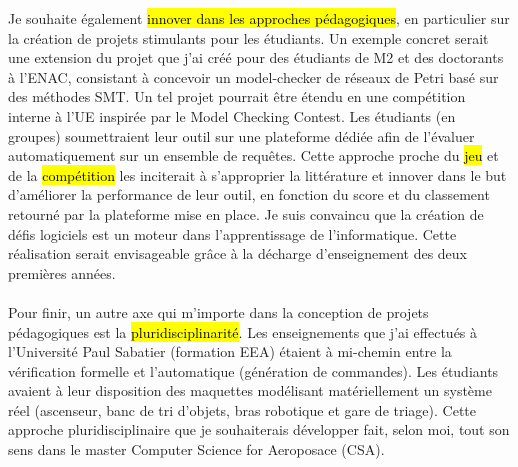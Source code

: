 Je souhaite également \hl{innover dans les approches pédagogiques}, en
particulier sur la création de projets stimulants pour les étudiants. Un exemple
concret serait une extension du projet que j'ai créé pour des étudiants de M2 et
des doctorants à l'ENAC, consistant à concevoir un model-checker de réseaux de
Petri basé sur des méthodes SMT. Un tel projet pourrait être étendu en une
compétition interne à l'UE inspirée par le Model Checking Contest. Les étudiants
(en groupes) soumettraient leur outil sur une plateforme dédiée afin de
l'évaluer automatiquement sur un ensemble de requêtes. Cette approche proche du
\hl{jeu} et de la \hl{compétition} les inciterait à s'approprier la littérature
et innover dans le but d'améliorer la performance de leur outil, en fonction du
score et du classement retourné par la plateforme mise en place. Je suis
convaincu que la création de défis logiciels est un moteur dans l'apprentissage
de l'informatique. Cette réalisation serait envisageable grâce à la décharge
d'enseignement des deux premières années.\\\\


Pour finir, un autre axe qui m'importe dans la conception de projets
pédagogiques est la \hl{pluridisciplinarité}. Les enseignements que j'ai
effectués à l'Université Paul Sabatier (formation EEA) étaient à mi-chemin entre
la vérification formelle et l'automatique (génération de commandes). Les
étudiants avaient à leur disposition des maquettes modélisant matériellement un
système réel (ascenseur, banc de tri d'objets, bras robotique et gare de
triage). Cette approche pluridisciplinaire que je souhaiterais développer fait,
selon moi, tout son sens dans le master Computer Science for Aeroposace (CSA).\\